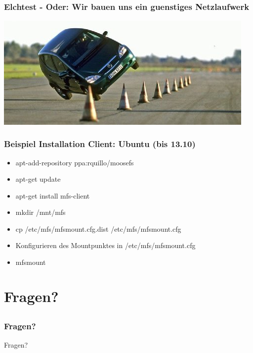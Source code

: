 \documentclass{beamer}
\begin{document}
\subsection*{}

\begin{frame}
	\frametitle{Elchtest - Oder: Wir bauen uns ein guenstiges Netzlaufwerk}
	\centering
	\includegraphics[scale=0.5]{elchtest.jpg}	
\end{frame}

\begin{frame}

\end{frame}

\begin{frame}
	\frametitle{Beispiel Installation Client: Ubuntu (bis 13.10)}
	\begin{itemize}
		\item apt-add-repository ppa:rquillo/moosefs
		\item apt-get update
		\item apt-get install mfs-client
		\item mkdir /mnt/mfs 
		\item cp /etc/mfs/mfsmount.cfg.dist /etc/mfs/mfsmount.cfg
		\item Konfigurieren des Mountpunktes in /etc/mfs/mfsmount.cfg
		\item mfsmount
	\end{itemize}
\end{frame}


\section{Fragen?}
\subsection*{}

\begin{frame}
	\frametitle{Fragen?}
	\begin{center}
		\large Fragen?
	\end{center}
\end{frame}
\end{document}
